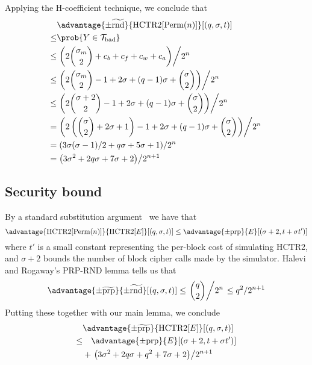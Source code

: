 \documentclass[hctr2.tex]{subfiles}
\begin{document}
Applying the H-coefficient technique, we conclude that
\begin{align*}
    & \advantage{\pm\widetilde{\mathrm{rnd}}}{\HCTR[\Perm(n)]}[(q, \sigma, t)] \\
    \leq & \prob{Y \in \Tb} \\
    \leq & \left.\left(2\binom{\sigma_m}{2} + c_b + c_f + c_w + c_a\right)\middle/2^n\right. \\
    \leq & \left.\left(2\binom{\sigma_m}{2} - 1 + 2\sigma + (q-1)\sigma + \binom{\sigma}{2}\right)\middle/2^n\right. \\
    \leq & \left.\left(2\binom{\sigma + 2}{2} - 1 + 2\sigma + (q-1)\sigma + \binom{\sigma}{2}\right)\middle/2^n\right. \\
    = & \left.\left(2\left(\binom{\sigma}{2} + 2\sigma + 1\right) - 1 + 2\sigma + (q-1)\sigma + \binom{\sigma}{2}\right)\middle/2^n\right. \\
    = & \left.\left(3\sigma(\sigma - 1)/2 + q\sigma + 5\sigma + 1\right)\middle/2^n\right. \\
    = & \left.\left(3\sigma^2 + 2q\sigma + 7\sigma + 2\right)\middle/2^{n+1}\right.
\end{align*}

\subsection{Security bound}\label{securitybound}
By a standard substitution argument~\cite{cbcsec,concrete} we have that
\begin{displaymath}
    \advantage{\HCTR[\Perm(n)]}{\HCTR[E]}[(q, \sigma, t)]
    \leq \advantage{\pm \mathrm{prp}}{E}[(\sigma + 2, t + \sigma t')]
\end{displaymath}
where \(t'\) is a small constant
representing the per-block cost of simulating HCTR2, and
\(\sigma + 2\) bounds the number of block cipher calls made by the simulator.
Halevi and Rogaway's PRP-RND lemma
\cite[Appendix C, Lemma 6]{cmc} tells us that
\begin{displaymath}
    \advantage{\pm \widetilde{\mathrm{prp}}}{\pm\widetilde{\mathrm{rnd}}}[(q, \sigma, t)] 
    \leq \left.\binom{q}{2}\middle/2^n\right.
    \leq q^2/2^{n+1}
\end{displaymath}
Putting these together with our main lemma, we conclude
\begin{align*}
    &\advantage{\pm \widetilde{\mathrm{prp}}}{\HCTR[E]}[(q, \sigma, t)] \\
    \leq & \quad \advantage{\pm \mathrm{prp}}{E}[(\sigma + 2, t + \sigma t')] \\
    &+ \left.\left(3\sigma^2 + 2q\sigma + q^2 + 7\sigma + 2\right)\middle/2^{n+1}\right.
\end{align*}
\end{document}
